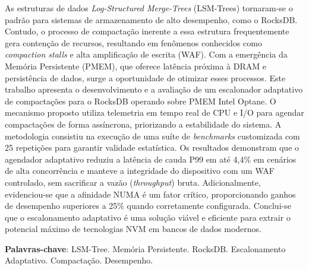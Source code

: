 
\setlength{\absparsep}{18pt} %
\begin{resumo}
As estruturas de dados \textit{Log-Structured Merge-Trees} (LSM-Trees) tornaram-se o padrão para sistemas de armazenamento de alto desempenho, como o RocksDB. Contudo, o processo de compactação inerente a essa estrutura frequentemente gera contenção de recursos, resultando em fenômenos conhecidos como \textit{compaction stalls} e alta amplificação de escrita (WAF). Com a emergência da Memória Persistente (PMEM), que oferece latência próxima à DRAM e persistência de dados, surge a oportunidade de otimizar esses processos. Este trabalho apresenta o desenvolvimento e a avaliação de um escalonador adaptativo de compactações para o RocksDB operando sobre PMEM Intel Optane. O mecanismo proposto utiliza telemetria em tempo real de CPU e I/O para agendar compactações de forma assíncrona, priorizando a estabilidade do sistema. A metodologia consistiu na execução de uma suíte de \textit{benchmarks} customizada com 25 repetições para garantir validade estatística. Os resultados demonstram que o agendador adaptativo reduziu a latência de cauda P99 em até 4,4\% em cenários de alta concorrência e manteve a integridade do dispositivo com um WAF controlado, sem sacrificar a vazão (\textit{throughput}) bruta. Adicionalmente, evidenciou-se que a afinidade NUMA é um fator crítico, proporcionando ganhos de desempenho superiores a 25\% quando corretamente configurada. Conclui-se que o escalonamento adaptativo é uma solução viável e eficiente para extrair o potencial máximo de tecnologias NVM em bancos de dados modernos.


 \textbf{Palavras-chave}: LSM-Tree. Memória Persistente. RocksDB. Escalonamento Adaptativo. Compactação. Desempenho.
\end{resumo}


